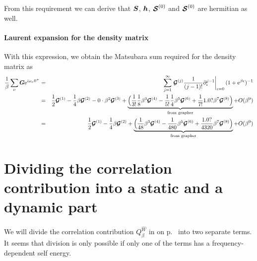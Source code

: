 \documentclass[11pt,a4paper]{report}
\begin{document}
From this requirement we can derive that $\bm{S}$, $\bm{h}$,
$\bm{\mathcal{S}}^{(0)}$ and $\bm{\mathcal{S}}^{(0)}$ are hermitian as well.

\subsubsection{Laurent expansion for the density matrix}
With this expression, we obtain the Matsubara sum required for the
density matrix as
\begin{eqnarray*}
\frac{1}{\beta}\sum_\nu\bm{G}\mathrm{e}^{i\omega_\nu0^+}
&=&\sum_{j=1}^\infty
\left.\bm{\mathcal{G}}^{(j)}\frac{1}{(j-1)!}
\partial^{j-1}_\epsilon\right|_{\epsilon=0}(1+\mathrm{e}^{\beta\epsilon})^{-1}
\nonumber\\
&=&
\frac{1}{2}\bm{\mathcal{G}}^{(1)}
-\frac{1}{4}\beta\bm{\mathcal{G}}^{(2)}
-0\cdot\beta^2\bm{\mathcal{G}}^{(3)}
+\underbrace{\Bigl(
\frac{1}{3!}\frac{1}{8}\beta^3\bm{\mathcal{G}}^{(4)}
-\frac{1}{5!}\frac{1}{4}\beta^5\bm{\mathcal{G}}^{(6)}
+\frac{1}{7!}1.0?\beta^7\bm{\mathcal{G}}^{(8)}\Bigr)
}_{\text{from grapher}}
+O(\beta^9)
\nonumber\\
&=&
\frac{1}{2}\bm{\mathcal{G}}^{(1)}
-\frac{1}{4}\beta\bm{\mathcal{G}}^{(2)}
+\underbrace{\Bigl(
\frac{1}{48}\beta^3\bm{\mathcal{G}}^{(4)}
-\frac{1}{480}\beta^5\bm{\mathcal{G}}^{(6)}
+\frac{1.0?}{4320}\beta^7\bm{\mathcal{G}}^{(8)}\Bigr)}_{\text{from grapher}}
+O(\beta^9)
\end{eqnarray*}




\chapter{Dividing the correlation contribution into a static and a dynamic part}
\label{sec:sdlitcorrelation}
We will divide the correlation contribution $Q^{\hat{W}}_\beta$ in
 on p.~\pageref{eq:dmfQgreen} into two separate
terms. It seems that division is only possible if only one of the
terms has a frequency-dependent self energy.
\end{document}

